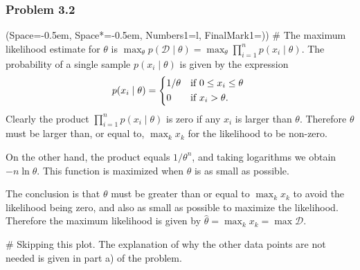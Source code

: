 \documentclass[12pt, a4paper]{article}
\newcommand{\listSpace}{-0.5em}%
\newcommand{\D}{\mathcal{D}}
\begin{document}
\subsubsection*{Problem 3.2}
\begin{easylist}[enumerate]
\ListProperties(Space=\listSpace, Space*=\listSpace, Numbers1=l, FinalMark1={)})
# The maximum likelihood estimate for $\theta$ is $\max_\theta p(\D  \mid  \theta) = \max_\theta \prod_{i=1}^{n} p(x_i  \mid  \theta)$.
The probability of a single sample $p(x_i  \mid  \theta)$ is given by the expression
\begin{equation*}
	p(x_i  \mid  \theta) = 
	\begin{dcases*}
	1/\theta & if $0 \leq x_i \leq \theta$ \\
	0 & if $ x_i > \theta$.
	\end{dcases*}
\end{equation*}
Clearly the product $\prod_{i=1}^{n} p(x_i  \mid  \theta)$ is zero if any $x_i$ is larger than $\theta$.
Therefore $\theta$ must be larger than, or equal to, $\max_k x_k$ for the likelihood to be non-zero.

On the other hand, the product equals $1 /\theta^n$, and taking logarithms we obtain $-n \ln \theta$.
This function is maximized when $\theta$ is as small as possible.

The conclusion is that $\theta$ must be greater than or equal to $\max_k x_k$ to avoid the likelihood being zero, and also as small as possible to maximize the likelihood.
Therefore the maximum likelihood is given by $\hat{\theta} = \max_k x_k = \max \D$.

# Skipping this plot. 
The explanation of why the other data points are not needed is given in part a) of the problem.
\end{easylist}
\end{document}
